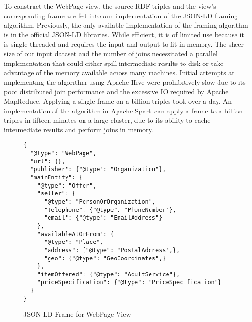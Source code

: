 To construct the WebPage view, the source RDF triples and the view's corresponding frame are fed into our implementation of the JSON-LD framing algorithm.  
Previously, the only available implementation of the framing algorithm is in the official JSON-LD libraries.  
While efficient, it is of limited use because it is single threaded and requires the input and output to fit in memory.
The sheer size of our input dataset and the number of joins necessitated a parallel implementation that could either spill intermediate results to disk or take advantage of the memory available across many machines. 
Initial attempts at implementing the algorithm using Apache Hive were prohibitively slow due to its poor distributed join performance and the excessive IO required by Apache MapReduce.  Applying a single frame on a billion triples took over a day.  
An implementation of the algorithm in Apache Spark can apply a frame to a billion triples in fifteen minutes on a large cluster, due to its ability to cache intermediate results and perform joins in memory.   
\begin{figure}[h]
\vspace{-0.2cm}
{\footnotesize
\begin{verbatim}
{
  "@type": "WebPage",
  "url": {},
  "publisher": {"@type": "Organization"},
  "mainEntity": {
    "@type": "Offer",
    "seller": {
      "@type": "PersonOrOrganization",
      "telephone": {"@type": "PhoneNumber"},
      "email": {"@type": "EmailAddress"}
    },
    "availableAtOrFrom": {
      "@type": "Place",
      "address": {"@type": "PostalAddress",},
      "geo": {"@type": "GeoCoordinates",}
    },
    "itemOffered": {"@type": "AdultService"},
    "priceSpecification": {"@type": "PriceSpecification"}
  }
}
\end{verbatim}}
\caption{JSON-LD Frame for WebPage View}
\label{fig:json_ld_webpage_view}
\vspace{-0.2cm}
\end{figure}
